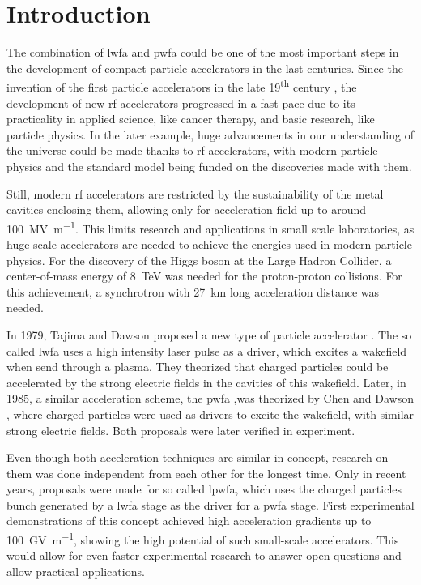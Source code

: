 \documentclass[bachelor_thesis]{subfiles}
\begin{document}
\chapter{Introduction}
The combination of \gls{lwfa} and \gls{pwfa} could be one of the most important steps in the development of compact particle accelerators in the last centuries.
Since the invention of the first particle accelerators in the late 19\textsuperscript{th} century \cite{Malka2016}, the development of new \gls{rf} accelerators progressed in a fast pace
due to its practicality in applied science, like cancer therapy, and basic research, like particle physics. In the later example, huge advancements in our understanding of the universe
could be made thanks to \gls{rf} accelerators, with modern particle physics and the standard model being funded on the discoveries made with them.

Still, modern \gls{rf} accelerators are restricted by the sustainability of the metal cavities enclosing them, allowing only for acceleration field up to around \qty{100}{\mega\volt\per\m}.
This limits research and applications in small scale laboratories, as huge scale accelerators are needed to achieve the energies used in modern particle physics.
For the discovery of the Higgs boson at the Large Hadron Collider, a center-of-mass energy of \qty{8}{\TeV} \cite{Aad2012} was needed for the proton-proton collisions.
For this achievement, a synchrotron with \qty{27}{\km} long acceleration distance was needed.

In 1979, Tajima and Dawson proposed a new type of particle accelerator \cite{Tajima1979}. The so called \acrlong{lwfa} uses a high intensity laser pulse as a driver, which excites a wakefield
when send through a plasma. They theorized that charged particles could be accelerated by the strong electric fields in the cavities of this wakefield.
Later, in 1985, a similar acceleration scheme, the \acrlong{pwfa} ,was theorized by Chen and Dawson \cite{Chen1985}, where charged particles were used as drivers to excite the wakefield, with similar strong electric fields.
Both proposals were later verified in experiment. 

Even though both acceleration techniques are similar in concept, research on them was done independent from each other for the longest time. Only in recent years, 
proposals \cite{Ossa2019} were made for so called \gls{lpwfa}, which uses the charged particles bunch generated by a \gls{lwfa} stage as the driver for a \gls{pwfa} stage.
First experimental demonstrations of this concept \cite{Kurz2021} achieved high acceleration gradients up to \qty{100}{\giga\volt\per\m}, showing the high potential of
such small-scale accelerators. This would allow for even faster experimental research to answer open questions and allow practical applications.
\end{document}
